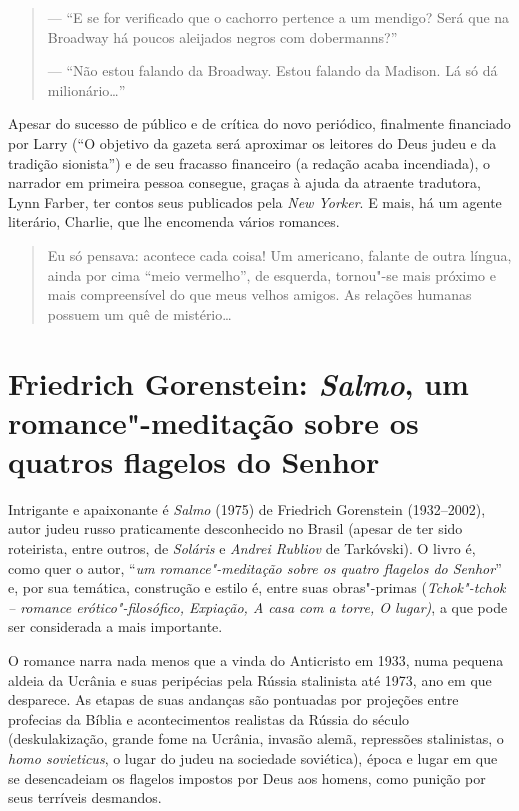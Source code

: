 {\begin{quote}
--- ``E se for verificado que o cachorro pertence a um mendigo? Será que na Broadway há poucos aleijados negros com dobermanns?''

--- ``Não estou falando da Broadway. Estou falando da Madison. Lá só dá milionário\ldots{}''
\end{quote}

Apesar do sucesso de público e de crítica do novo periódico, finalmente financiado por Larry (``O objetivo da gazeta será aproximar os leitores do Deus judeu e da tradição sionista'') e de seu fracasso financeiro (a redação acaba incendiada), o narrador em primeira pessoa consegue, graças à ajuda da atraente tradutora, Lynn Farber, ter contos seus  publicados pela \emph{New Yorker}. E mais, há um agente literário, Charlie, que lhe encomenda vários romances.

\begin{quote}
Eu só pensava: acontece cada coisa! Um americano, falante de outra língua, ainda por cima ``meio vermelho'', de esquerda, tornou"-se mais próximo e mais compreensível do que meus velhos amigos. As relações humanas possuem um quê de mistério\ldots{}
\end{quote}

\chapter*{Friedrich Gorenstein: \emph{Salmo}, um romance"-meditação sobre os quatros flagelos do Senhor}


Intrigante e apaixonante é \emph{Salmo} (1975) de Friedrich Gorenstein (1932--2002), autor judeu russo praticamente desconhecido no Brasil (apesar de ter sido roteirista, entre outros, de \emph{Soláris}
e \emph{Andrei Rubliov} de Tarkóvski). O livro é, como quer o autor,
``\emph{um romance"-meditação sobre os quatro flagelos do Senhor}'' e,
por sua temática, construção e estilo é, entre suas obras"-primas
(\emph{Tchok"-tchok -- romance erótico"-filosófico, Expiação, A casa com a
torre, O lugar)}, a que pode ser considerada a mais importante.

O romance narra nada menos que a vinda do Anticristo em 1933, numa
pequena aldeia da Ucrânia e suas peripécias pela Rússia stalinista até
1973, ano em que desparece. As etapas de suas andanças são pontuadas por
projeções entre profecias da Bíblia e acontecimentos realistas da Rússia
do século  (deskulakização, grande fome na Ucrânia, invasão alemã,
repressões stalinistas, o \emph{homo sovieticus}, o lugar do judeu na
sociedade soviética), época e lugar em que se desencadeiam os flagelos
impostos por Deus aos homens, como punição por seus terríveis desmandos.

}
